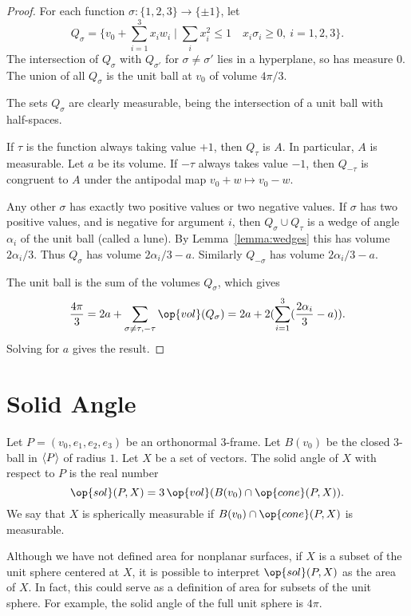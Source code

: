 \begin{proof} For each function $\sigma:\{1,2,3\}\to\{\pm 1\}$, let
    $$
    Q_\sigma =
    \{ v_0 + \sum_{i=1}^3 x_i w_i \mid \sum_i x_i^2\le 1\quad
    x_i\sigma_i \ge 0,\ i=1,2,3\}.
    $$
The intersection of $Q_\sigma$ with $Q_{\sigma'}$ for
$\sigma\ne\sigma'$ lies in a hyperplane, so has measure $0$.  The
union of all $Q_\sigma$ is the unit ball at $v_0$ of volume
$4\pi/3$.

The sets $Q_\sigma$ are clearly measurable, being the intersection
of a unit ball with half-spaces.

If $\tau$ is the function always taking value $+1$, then $Q_{\tau}$
is $A$.  In particular, $A$ is measurable. Let $a$ be its volume.
If $-\tau$ always takes value $-1$, then $Q_{-\tau}$ is congruent to
$A$ under the antipodal map $v_0 + w\mapsto v_0-w$.

Any other $\sigma$ has exactly two positive values or two negative
values. If $\sigma$ has two positive values, and is negative for
argument $i$,  then $Q_\sigma\cup Q_{\tau}$ is a wedge of angle
$\alpha_i$ of the unit ball (called a lune). By
Lemma~\ref{lemma:wedges} this has volume $2\alpha_i/3$. Thus
$Q_\sigma$ has volume $2\alpha_i/3 - a$. Similarly $Q_{-\sigma}$ has
volume $2\alpha_i/3 - a$.

The unit ball is the sum of the volumes $Q_\sigma$, which gives
    $$\frac{4\pi}3 = 2a + \sum_{\sigma\ne\tau,-\tau}
    \op{vol}(Q_\sigma) =
    2 a + 2 (\sum_{i=1}^3 (\frac{2\alpha_i}{3} - a)).$$
Solving for $a$ gives the result.
\end{proof}

\section{Solid Angle}

\begin{definition}
Let $P=(v_0,e_1,e_2,e_3)$ be an orthonormal $3$-frame.    Let
$B(v_0)$ be the closed $3$-ball in ${\langle P\rangle}$ of radius $1$. Let
$X$ be a set of vectors.  The solid angle of $X$ with respect to $P$
is the real number
    $$\op{sol}(P,X) = 3\,\op{vol}(B(v_0)\cap\op{cone}(P,X)).$$  We
    say that $X$ is spherically measurable if
    $B(v_0)\cap\op{cone}(P,X)$ is measurable.
\end{definition}

\begin{remark} Although we have not defined area for nonplanar
surfaces, if $X$ is a subset of the unit sphere centered at $X$, it
is possible to interpret $\op{sol}(P,X)$ as the area of $X$.  In
fact, this could serve as a definition of area for subsets of the
unit sphere.  For example, the solid angle of the full unit sphere
is $4\pi$.
\end{remark}

